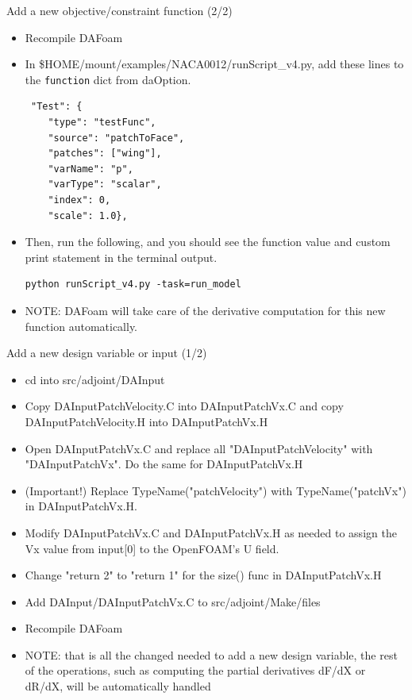 \documentclass{bredelebeamer}
\begin{document}
\begin{frame}[fragile]{Add a new objective/constraint function (2/2)}

\begin{itemize}
  \item Recompile DAFoam
  \item In \$HOME/mount/examples/NACA0012/runScript\_v4.py, add these lines to the \texttt{function} dict from daOption.
  \begin{lstlisting}
 "Test": {
    "type": "testFunc",
    "source": "patchToFace",
    "patches": ["wing"],
    "varName": "p",
    "varType": "scalar",
    "index": 0,
    "scale": 1.0},
 \end{lstlisting}
  \item Then, run the following, and you should see the function value and custom print statement in the terminal output.
 \begin{lstlisting}
python runScript_v4.py -task=run_model
\end{lstlisting}
\item NOTE: DAFoam will take care of the derivative computation for this new function automatically.
\end{itemize}

\end{frame}


\begin{frame}[fragile]{Add a new design variable or input (1/2)}

\begin{itemize}
  \item cd into src/adjoint/DAInput
  \item Copy DAInputPatchVelocity.C into DAInputPatchVx.C and copy DAInputPatchVelocity.H into DAInputPatchVx.H
  \item Open DAInputPatchVx.C and replace all "DAInputPatchVelocity" with "DAInputPatchVx". Do the same for DAInputPatchVx.H
  \item (Important!) Replace TypeName("patchVelocity") with TypeName("patchVx") in DAInputPatchVx.H.
  \item Modify DAInputPatchVx.C and  DAInputPatchVx.H as needed to assign the Vx value from input[0] to the OpenFOAM's U field.
  \item Change "return 2" to "return 1" for the size() func in DAInputPatchVx.H
  \item Add DAInput/DAInputPatchVx.C to src/adjoint/Make/files
  \item Recompile DAFoam
  \item NOTE: that is all the changed needed to add a new design variable, the rest of the operations, such as computing the partial derivatives dF/dX or dR/dX, will be automatically handled

\end{itemize}

\end{frame}
\end{document}
